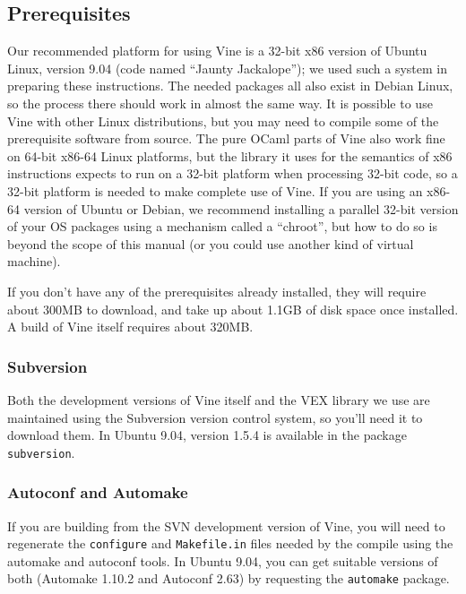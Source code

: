 \documentclass[11pt,onecolumn]{article}
\begin{document}
\subsection{\label{sec:prereqs}Prerequisites}

Our recommended platform for using Vine is a 32-bit x86 version of
Ubuntu Linux, version 9.04 (code named ``Jaunty Jackalope''); we used
such a system in preparing these instructions.
%
The needed packages all also exist in Debian Linux, so the process
there should work in almost the same way.
%
It is possible to use Vine with other Linux distributions, but you may
need to compile some of the prerequisite software from source.
%
The pure OCaml parts of Vine also work fine on 64-bit x86-64 Linux
platforms, but the library it uses for the semantics of x86
instructions expects to run on a 32-bit platform when processing
32-bit code, so a 32-bit platform is needed to make complete use of
Vine.
%
If you are using an x86-64 version of Ubuntu or Debian, we recommend
installing a parallel 32-bit version of your OS packages using a
mechanism called a ``chroot'', but how to do so is beyond the scope of
this manual (or you could use another kind of virtual machine).

If you don't have any of the prerequisites already installed, they
will require about 300MB to download, and take up about 1.1GB of disk
space once installed.
%
A build of Vine itself requires about 320MB.

\begin{svn}
\subsubsection{Subversion}

Both the development versions of Vine itself and the VEX library we
use are maintained using the Subversion version control system, so
you'll need it to download them. In Ubuntu 9.04, version 1.5.4 is
available in the package {\tt subversion}.
\end{svn}

\begin{svn}
\subsubsection{Autoconf and Automake}

If you are building from the SVN development version of Vine, you will
need to regenerate the {\tt configure} and {\tt Makefile.in} files
needed by the compile using the automake and autoconf tools. In Ubuntu
9.04, you can get suitable versions of both (Automake 1.10.2 and
Autoconf 2.63) by requesting the {\tt automake} package.
\end{svn}
\end{document}
